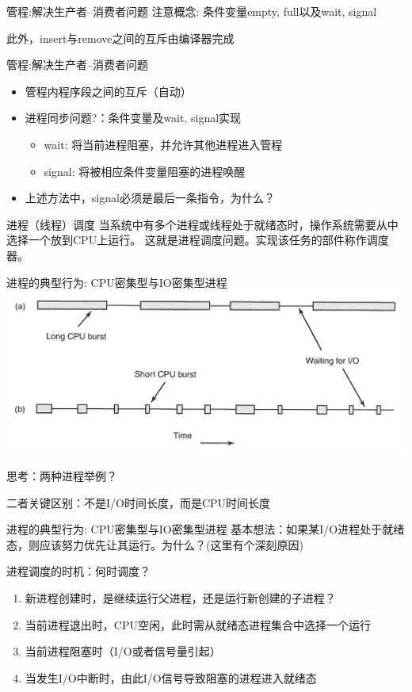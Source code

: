 \documentclass[xcolor=svgnames]{beamer}
\begin{document}
\begin{CJK*}{UTF8}{gbsn}
\begin{frame}{管程:解决生产者--消费者问题}
\alert{注意概念:} 条件变量empty, full以及wait, signal

此外，insert与remove之间的互斥由编译器完成
\end{frame}

\begin{frame}{管程:解决生产者--消费者问题}
\begin{itemize}
\item 管程内程序段之间的互斥（自动）
\item 进程同步问题?：条件变量及wait, signal实现
\begin{itemize}
\item wait: 将当前进程阻塞，并允许其他进程进入管程
\item signal: 将被相应条件变量阻塞的进程唤醒
\end{itemize}
\item 上述方法中，signal必须是最后一条指令，为什么？ 
\end{itemize}
\end{frame}

\begin{frame}{进程（线程）调度}
当系统中有多个进程或线程处于就绪态时，操作系统需要从中选择一个放到CPU上运行。
这就是进程调度问题。实现该任务的部件称作调度器。
\end{frame}

\begin{frame}{进程的典型行为: CPU密集型与IO密集型进程}
\includegraphics[width=1.0\textwidth]{behav.png}

思考：两种进程举例？

二者关键区别：不是I/O时间长度，而是CPU时间长度
\end{frame}

\begin{frame}{进程的典型行为: CPU密集型与IO密集型进程}
基本想法：如果某I/O进程处于就绪态，则应该努力优先让其运行。为什么？(这里有个深刻原因)
\end{frame}

\begin{frame}{进程调度的时机：何时调度？}
\begin{enumerate}
\item 新进程创建时，是继续运行父进程，还是运行新创建的子进程？
\item 当前进程退出时，CPU空闲，此时需从就绪态进程集合中选择一个运行
\item 当前进程阻塞时（I/O或者信号量引起）
\item 当发生I/O中断时，由此I/O信号导致阻塞的进程进入就绪态
\end{enumerate}
\end{frame}


\end{CJK*}
\end{document}
